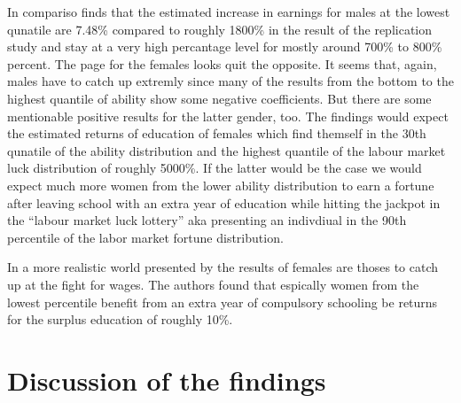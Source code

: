 \documentclass[12pt,a4paper]{article}
\begin{document}
In compariso \textcite{brunello} finds that the estimated increase in
earnings for males at the lowest qunatile are 7.48\% compared to roughly
1800\% in the result of the replication study and stay at a very high
percantage level for mostly around 700\% to 800\% percent. The page for
the females looks quit the opposite. It seems that, again, males have to
catch up extremly since many of the results from the bottom to the
highest quantile of ability show some negative coefficients. But there
are some mentionable positive results for the latter gender, too. The
findings would expect the estimated returns of education of females
which find themself in the 30th qunatile of the ability distribution and
the highest quantile of the labour market luck distribution of roughly
5000\%. If the latter would be the case we would expect much more women
from the lower ability distribution to earn a fortune after leaving
school with an extra year of education while hitting the jackpot in the
\enquote{labour market luck lottery} aka presenting an indivdiual in the
90th percentile of the labor market fortune distribution.

In a more realistic world presented by the results of
\textcite{brunello} females are thoses to catch up at the fight for
wages. The authors found that espically women from the lowest percentile
benefit from an extra year of compulsory schooling be returns for the
surplus education of roughly 10\%.

\hypertarget{discussion-of-the-findings}{%
\section{Discussion of the findings}\label{discussion-of-the-findings}}
\end{document}
